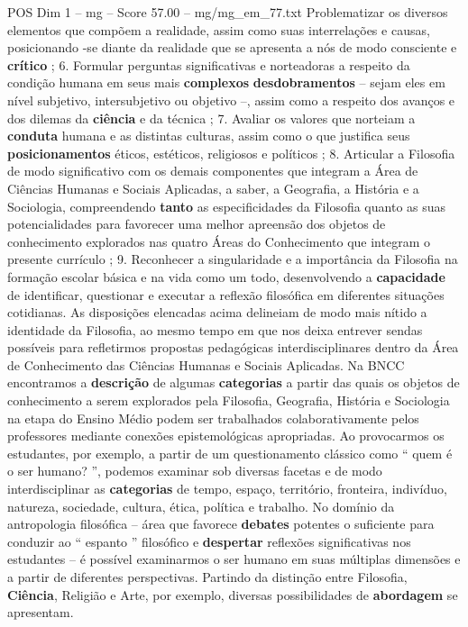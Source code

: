 \begin{textsample}{POS Dim 1 – mg – Score 57.00 – mg/mg\_em\_77.txt}
Problematizar os diversos elementos que compõem a realidade, assim como suas interrelações e causas, posicionando -se diante da realidade que se apresenta a nós de modo consciente e \textbf{crítico} ; 6.
Formular perguntas significativas e norteadoras a respeito da condição humana em seus mais \textbf{complexos} \textbf{desdobramentos} – sejam eles em nível subjetivo, intersubjetivo ou objetivo –, assim como a respeito dos avanços e dos dilemas da \textbf{ciência} e da técnica ; 7.
Avaliar os valores que norteiam a \textbf{conduta} humana e as distintas culturas, assim como o que justifica seus \textbf{posicionamentos} éticos, estéticos, religiosos e políticos ; 8.
Articular a Filosofia de modo significativo com os demais componentes que integram a Área de Ciências Humanas e Sociais Aplicadas, a saber, a Geografia, a História e a Sociologia, compreendendo \textbf{tanto} as especificidades da Filosofia quanto as suas potencialidades para favorecer uma melhor apreensão dos objetos de conhecimento explorados nas quatro Áreas do Conhecimento que integram o presente currículo ; 9.
Reconhecer a singularidade e a importância da Filosofia na formação escolar básica e na vida como um todo, desenvolvendo a \textbf{capacidade} de identificar, questionar e executar a reflexão filosófica em diferentes situações cotidianas.
As disposições elencadas acima delineiam de modo mais nítido a identidade da Filosofia, ao mesmo tempo em que nos deixa entrever sendas possíveis para refletirmos propostas pedagógicas interdisciplinares dentro da Área de Conhecimento das Ciências Humanas e Sociais Aplicadas.
Na BNCC encontramos a \textbf{descrição} de algumas \textbf{categorias} a partir das quais os objetos de conhecimento a serem explorados pela Filosofia, Geografia, História e Sociologia na etapa do Ensino Médio podem ser trabalhados colaborativamente pelos professores mediante conexões epistemológicas apropriadas.
Ao provocarmos os estudantes, por exemplo, a partir de um questionamento clássico como “ quem é o ser humano? ”, podemos examinar sob diversas facetas e de modo interdisciplinar as \textbf{categorias} de tempo, espaço, território, fronteira, indivíduo, natureza, sociedade, cultura, ética, política e trabalho.
No domínio da antropologia filosófica – área que favorece \textbf{debates} potentes o suficiente para conduzir ao “ espanto ” filosófico e \textbf{despertar} reflexões significativas nos estudantes – é possível examinarmos o ser humano em suas múltiplas dimensões e a partir de diferentes perspectivas.
Partindo da distinção entre Filosofia, \textbf{Ciência}, Religião e Arte, por exemplo, diversas possibilidades de \textbf{abordagem} se apresentam.

\end{textsample}
